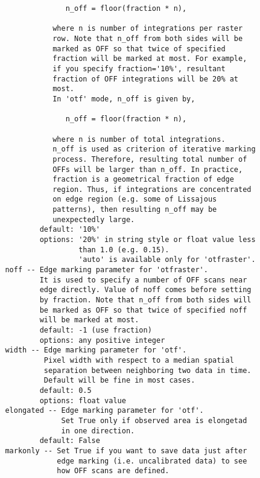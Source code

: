 \begin{verbatim}
                       n_off = floor(fraction * n),

                    where n is number of integrations per raster 
                    row. Note that n_off from both sides will be  
                    marked as OFF so that twice of specified 
                    fraction will be marked at most. For example, 
                    if you specify fraction='10%', resultant 
                    fraction of OFF integrations will be 20% at 
                    most.
                    In 'otf' mode, n_off is given by,

                       n_off = floor(fraction * n),

                    where n is number of total integrations.
                    n_off is used as criterion of iterative marking
                    process. Therefore, resulting total number of 
                    OFFs will be larger than n_off. In practice,
                    fraction is a geometrical fraction of edge
                    region. Thus, if integrations are concentrated
                    on edge region (e.g. some of Lissajous
                    patterns), then resulting n_off may be 
                    unexpectedly large.
                 default: '10%'
                 options: '20%' in string style or float value less 
                          than 1.0 (e.g. 0.15).
                          'auto' is available only for 'otfraster'. 
         noff -- Edge marking parameter for 'otfraster'.
                 It is used to specify a number of OFF scans near 
                 edge directly. Value of noff comes before setting 
                 by fraction. Note that n_off from both sides will 
                 be marked as OFF so that twice of specified noff 
                 will be marked at most.
                 default: -1 (use fraction)
                 options: any positive integer
         width -- Edge marking parameter for 'otf'.
                  Pixel width with respect to a median spatial 
                  separation between neighboring two data in time.
                  Default will be fine in most cases.
                 default: 0.5
                 options: float value
         elongated -- Edge marking parameter for 'otf'.
                      Set True only if observed area is elongetad 
                      in one direction.
                 default: False
         markonly -- Set True if you want to save data just after 
                     edge marking (i.e. uncalibrated data) to see 
                     how OFF scans are defined.

\end{verbatim}
